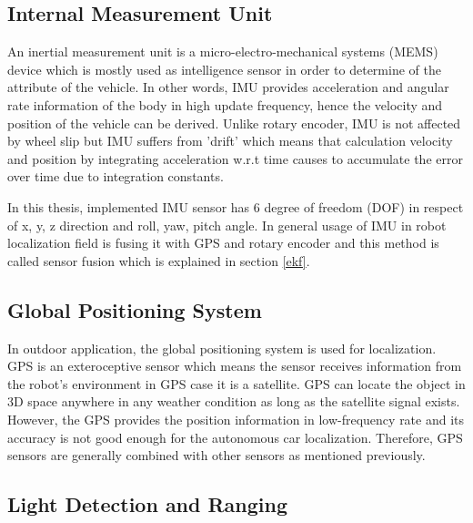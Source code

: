 \subsection{Internal Measurement Unit}
An inertial measurement unit is a micro-electro-mechanical systems (MEMS) device which is mostly used as intelligence sensor in order to determine of the attribute of the vehicle. In other words, IMU provides acceleration and angular rate information of the body in high update frequency, hence the velocity and position of the vehicle can be derived. Unlike rotary encoder, IMU is not affected by wheel slip but IMU suffers from 'drift' which means that calculation velocity and position by integrating acceleration w.r.t time causes to accumulate the error over time due to integration constants. %
\\ 
\par In this thesis, implemented IMU sensor has 6 degree of freedom (DOF) in respect of x, y, z direction and roll, yaw, pitch angle. In general usage of IMU in robot localization field is fusing it with GPS and rotary encoder and this method is called sensor fusion which is explained in section \ref{ekf}.

\subsection{Global Positioning System}%

In outdoor application, the global positioning system is used for localization. GPS is an exteroceptive sensor which means the sensor receives information from the robot's environment in GPS case it is a satellite. GPS can locate the object in 3D space anywhere in any weather condition as long as the satellite signal exists. However, the GPS provides the position information in low-frequency rate and its accuracy is not good enough for the autonomous car localization. Therefore, GPS sensors are generally combined with other sensors as mentioned previously.%

\subsection{Light Detection and Ranging}

